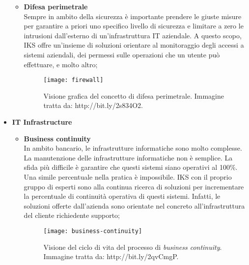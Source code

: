 \begin{itemize}
\begin{itemize}
		\newpage
	 	\item \textbf{Difesa perimetrale}\\ 
	 	Sempre in ambito della sicurezza è importante prendere le 
		giuste misure per garantire a priori uno specifico livello 
		di sicurezza e limitare a zero le intrusioni dall'esterno 
	 	di un'infrastruttura IT aziendale. A questo scopo, IKS offre 
		un'insieme di soluzioni orientare al monitoraggio degli 
		accessi a sistemi aziendali, dei permessi sulle operazioni 
	 	che un utente può effettuare, e molto altro;
	 	\begin{figure}[htbp]
	 		\begin{center}
	 			\texttt{[image: firewall]}
	 			\caption{Visione grafica del concetto di difesa 
				perimetrale. Immagine tratta da: 
				http://bit.ly/2s834O2.}
	 		\end{center}
	 	\end{figure}
	 	
	 \end{itemize}	
	\item \textbf{IT Infrastructure}\\
	 \begin{itemize}
	 	\item \textbf{Business continuity}\\
	 	In ambito bancario, le infrastrutture informatiche sono molto 
		complesse. La manutenzione delle infrastrutture informatiche non è 
		semplice. La sfida più difficile è garantire che questi sistemi siano 
		operativi al 100\%. Una simile percentuale nella pratica è 
		impossibile. IKS con il proprio gruppo di esperti sono alla 
		continua ricerca di soluzioni per incrementare la percentuale 
		di continuità operativa di questi sistemi. Infatti, le 
		soluzioni offerte dall'azienda sono orientate nel concreto 
		all'infrastruttura del cliente richiedente supporto;
	 	\begin{figure}[htbp]
	 		\begin{center}
	 		\texttt{[image: business-continuity]}
				\caption{Visione del ciclo di vita del 
				processo di \emph{business continuity}. 
				Immagine tratta da: http://bit.ly/2qvCmgP.}
			\end{center}
			\end{figure}


\end{itemize}
\end{itemize}
